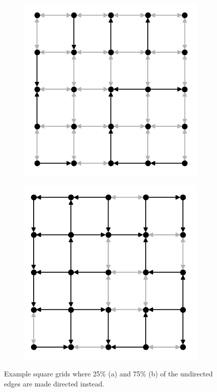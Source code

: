 \begin{figure}[t]
  \centering
  \begin{subfigure}{.40\textwidth}
    \centering
    \includegraphics[width=1.0\linewidth]{figures/dir_lattice_025.png}
    \caption{}
    \label{fig:dir-lattice-a}
  \end{subfigure}
  \hspace{25pt}
  \begin{subfigure}{.40\textwidth}
    \centering
    \includegraphics[width=1.0\linewidth]{figures/dir_lattice_075.png}
    \caption{}
    \label{fig:dir-lattice-b}
  \end{subfigure}
  \caption{
    Example square grids where 25\% (a) and 75\% (b) of the undirected edges are
made directed instead.
  }
  \label{fig:dir-lattice}
\end{figure}


